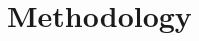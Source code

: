 \documentclass[7.5pt]{article}
\theoremstyle{plain}
\theoremstyle{definition}
\newcommand{\<}{\langle}
\renewcommand{\>}{\rangle}
\begin{document}
\begin{multicols}{2}


\end{multicols}

\pagebreak
\section{Methodology}
\end{document}
